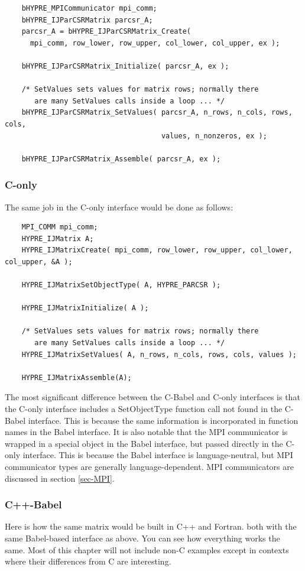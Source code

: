 \begin{verbatim}
    bHYPRE_MPICommunicator mpi_comm;
    bHYPRE_IJParCSRMatrix parcsr_A;
    parcsr_A = bHYPRE_IJParCSRMatrix_Create(
      mpi_comm, row_lower, row_upper, col_lower, col_upper, ex );

    bHYPRE_IJParCSRMatrix_Initialize( parcsr_A, ex );

    /* SetValues sets values for matrix rows; normally there
       are many SetValues calls inside a loop ... */
    bHYPRE_IJParCSRMatrix_SetValues( parcsr_A, n_rows, n_cols, rows, cols,
                                     values, n_nonzeros, ex );

    bHYPRE_IJParCSRMatrix_Assemble( parcsr_A, ex );
\end{verbatim}

\subsubsection{C-only}
The same job in the C-only interface would be done as follows:

\begin{verbatim}
    MPI_COMM mpi_comm;
    HYPRE_IJMatrix A;
    HYPRE_IJMatrixCreate( mpi_comm, row_lower, row_upper, col_lower, col_upper, &A );

    HYPRE_IJMatrixSetObjectType( A, HYPRE_PARCSR );

    HYPRE_IJMatrixInitialize( A );

    /* SetValues sets values for matrix rows; normally there
       are many SetValues calls inside a loop ... */
    HYPRE_IJMatrixSetValues( A, n_rows, n_cols, rows, cols, values );

    HYPRE_IJMatrixAssemble(A);
\end{verbatim}


The most significant difference between the C-Babel and C-only
interfaces is that the C-only interface includes a SetObjectType
function call not found in the C-Babel interface.  This is because the
same information is incorporated in function names in the Babel
interface.  It is also notable that the MPI communicator is wrapped in
a special object in the Babel interface, but passed directly in the
C-only interface.  This is because the Babel interface is
language-neutral, but MPI communicator types are generally
language-dependent.  MPI communicators are discussed in section
\ref{sec-MPI}.

\subsubsection{C++-Babel}
Here is how the same matrix would be built in C++ and Fortran.
both with the same Babel-based interface as above.
You can see how everything works the same.  Most of this chapter
will not include non-C examples except in contexts where their differences
from C are interesting.

